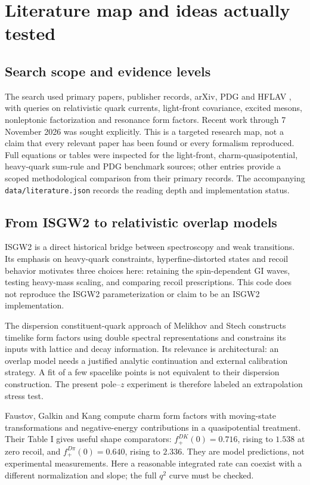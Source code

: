 \documentclass[11pt,a4paper]{article}
\begin{document}
\section{Literature map and ideas actually tested}
\subsection{Search scope and evidence levels}
The search used primary papers, publisher records, arXiv, PDG and HFLAV \cite{flag,pdgmultibody}, with queries on relativistic quark currents, light-front covariance, excited mesons, nonleptonic factorization and resonance form factors. Recent work through 7 November 2026 was sought explicitly. This is a targeted research map, not a claim that every relevant paper has been found or every formalism reproduced. Full equations or tables were inspected for the light-front, charm-quasipotential, heavy-quark sum-rule and PDG benchmark sources; other entries provide a scoped methodological comparison from their primary records. The accompanying \texttt{data/literature.json} records the reading depth and implementation status.

\subsection{From ISGW2 to relativistic overlap models}
ISGW2 \cite{isgw2} is a direct historical bridge between spectroscopy and weak transitions. Its emphasis on heavy-quark constraints, hyperfine-distorted states and recoil behavior motivates three choices here: retaining the spin-dependent GI waves, testing heavy-mass scaling, and comparing recoil prescriptions. This code does not reproduce the ISGW2 parameterization or claim to be an ISGW2 implementation.

The dispersion constituent-quark approach of Melikhov and Stech \cite{melikhov} constructs timelike form factors using double spectral representations and constrains its inputs with lattice and decay information. Its relevance is architectural: an overlap model needs a justified analytic continuation and external calibration strategy. A fit of a few spacelike points is not equivalent to their dispersion construction. The present pole--$z$ experiment is therefore labeled an extrapolation stress test.

Faustov, Galkin and Kang \cite{fgk} compute charm form factors with moving-state transformations and negative-energy contributions in a quasipotential treatment. Their Table I gives useful shape comparators: $f_+^{D K}(0)=0.716$, rising to $1.538$ at zero recoil, and $f_+^{D\pi}(0)=0.640$, rising to $2.336$. They are model predictions, not experimental measurements. Here a reasonable integrated rate can coexist with a different normalization and slope; the full $q^2$ curve must be checked.
\end{document}
